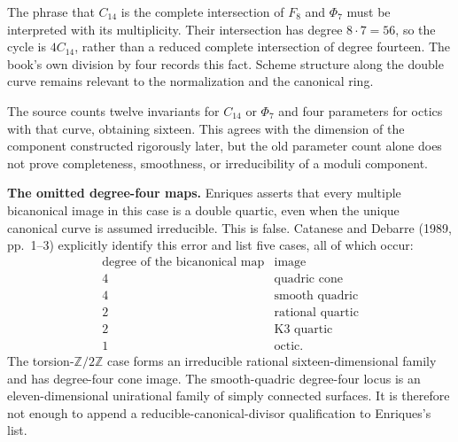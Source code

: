 The phrase that \(C_{14}\) is the complete intersection of \(F_8\) and \(\Phi_7\) must be interpreted with its multiplicity. Their intersection has degree \(8\cdot7=56\), so the cycle is \(4C_{14}\), rather than a reduced complete intersection of degree fourteen. The book's own division by four records this fact. Scheme structure along the double curve remains relevant to the normalization and the canonical ring.

The source counts twelve invariants for \(C_{14}\) or \(\Phi_7\) and four parameters for octics with that curve, obtaining sixteen. This agrees with the dimension of the component constructed rigorously later, but the old parameter count alone does not prove completeness, smoothness, or irreducibility of a moduli component.

\textbf{The omitted degree-four maps.}
Enriques asserts that every multiple bicanonical image in this case is a double quartic, even when the unique canonical curve is assumed irreducible. This is false. Catanese and Debarre (1989, pp.~1--3) explicitly identify this error and list five cases, all of which occur:
\[
\begin{array}{c|c}
\text{degree of the bicanonical map}&\text{image}\\ \hline
4&\text{quadric cone}\\
4&\text{smooth quadric}\\
2&\text{rational quartic}\\
2&\text{K3 quartic}\\
1&\text{octic}.
\end{array}
\]
The torsion-\(\mathbb Z/2\mathbb Z\) case forms an irreducible rational sixteen-dimensional family and has degree-four cone image. The smooth-quadric degree-four locus is an eleven-dimensional unirational family of simply connected surfaces. It is therefore not enough to append a reducible-canonical-divisor qualification to Enriques's list.


